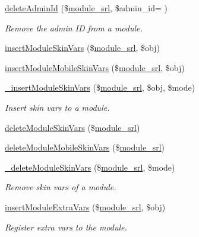 \begin{DoxyCompactItemize}
\hyperlink{classmoduleController_a3ba07d8a726a5f1d869480fa61a60487}{delete\+Admin\+Id} (\$\hyperlink{ko_8install_8php_a370bb6450fab1da3e0ed9f484a38b761}{module\+\_\+srl}, \$admin\+\_\+id= \textquotesingle{}\textquotesingle{})
\begin{DoxyCompactList}\small\item\em Remove the admin ID from a module. \end{DoxyCompactList}\item 
\hyperlink{classmoduleController_ad044df4dde2053b5dcbaf5077822290c}{insert\+Module\+Skin\+Vars} (\$\hyperlink{ko_8install_8php_a370bb6450fab1da3e0ed9f484a38b761}{module\+\_\+srl}, \$obj)
\item 
\hyperlink{classmoduleController_a6c7aab59734028d1c980053a75437a45}{insert\+Module\+Mobile\+Skin\+Vars} (\$\hyperlink{ko_8install_8php_a370bb6450fab1da3e0ed9f484a38b761}{module\+\_\+srl}, \$obj)
\item 
\hyperlink{classmoduleController_aea2dfb4f6a1d31acdbebf131058494cd}{\+\_\+insert\+Module\+Skin\+Vars} (\$\hyperlink{ko_8install_8php_a370bb6450fab1da3e0ed9f484a38b761}{module\+\_\+srl}, \$obj, \$mode)
\begin{DoxyCompactList}\small\item\em Insert skin vars to a module. \end{DoxyCompactList}\item 
\hyperlink{classmoduleController_ad85915b5cf2a31804f673cfc3320ac75}{delete\+Module\+Skin\+Vars} (\$\hyperlink{ko_8install_8php_a370bb6450fab1da3e0ed9f484a38b761}{module\+\_\+srl})
\item 
\hyperlink{classmoduleController_a16feed706aef2613cc417c68cb06ba8a}{delete\+Module\+Mobile\+Skin\+Vars} (\$\hyperlink{ko_8install_8php_a370bb6450fab1da3e0ed9f484a38b761}{module\+\_\+srl})
\item 
\hyperlink{classmoduleController_a88baeaa3755f270af223e17e7a96d20a}{\+\_\+delete\+Module\+Skin\+Vars} (\$\hyperlink{ko_8install_8php_a370bb6450fab1da3e0ed9f484a38b761}{module\+\_\+srl}, \$mode)
\begin{DoxyCompactList}\small\item\em Remove skin vars of a module. \end{DoxyCompactList}\item 
\hyperlink{classmoduleController_a1a8373bfcd3e1e8bc88f41bb777ad486}{insert\+Module\+Extra\+Vars} (\$\hyperlink{ko_8install_8php_a370bb6450fab1da3e0ed9f484a38b761}{module\+\_\+srl}, \$obj)
\begin{DoxyCompactList}\small\item\em Register extra vars to the module. \end{DoxyCompactList}\item 

\end{DoxyCompactItemize}
